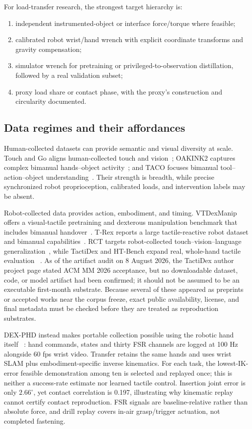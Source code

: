 For load-transfer research, the strongest target hierarchy is:

\begin{enumerate}
  \item independent instrumented-object or interface force/torque where feasible;
  \item calibrated robot wrist/hand wrench with explicit coordinate transforms and
  gravity compensation;
  \item simulator wrench for pretraining or privileged-to-observation
  distillation, followed by a real validation subset;
  \item proxy load share or contact phase, with the proxy's construction and
  circularity documented.
\end{enumerate}

\subsection{Data regimes and their affordances}

Human-collected datasets can provide semantic and visual diversity at scale.
Touch and Go aligns human-collected touch and vision~\cite{yang2022touchandgo}; OAKINK2
captures complex bimanual hands--object activity~\cite{zhan2024oakink2}; and TACO
focuses bimanual tool--action--object understanding~\cite{liu2024taco}. Their
strength is breadth, while precise synchronized robot proprioception, calibrated
loads, and intervention labels may be absent.

Robot-collected data provides action, embodiment, and timing. VTDexManip offers a
visual-tactile pretraining and dexterous manipulation benchmark that includes
bimanual handover~\cite{liu2025vtdexmanip}. T-Rex reports a large tactile-reactive
robot dataset and bimanual capabilities~\cite{niu2026trex}. RCT targets
robot-collected touch--vision--language generalization~\cite{he2026rct}, while
TactiDex and HT-Bench expand real, whole-hand tactile evaluation
~\cite{ni2026tactidex,huang2026htbench}. As of the artifact audit on 8 August
2026, the TactiDex author project page stated ACM MM 2026 acceptance, but no
downloadable dataset, code, or model artifact had been confirmed; it should not
be assumed to be an executable first-month substrate. Because several of these appeared as
preprints or accepted works near the corpus freeze, exact public availability,
license, and final metadata must be checked before they are treated as
reproduction substrates.

DEX-PHD instead makes portable collection possible using the robotic hand itself
~\cite{update2026dexphd}: hand commands, states and thirty FSR channels are logged
at 100 Hz alongside 60 fps wrist video. Transfer retains the same hands and uses
wrist SLAM plus embodiment-specific inverse kinematics. For each task, the
lowest-IK-error feasible demonstration among ten is selected and replayed once;
this is neither a success-rate estimate nor learned tactile control. Insertion
joint error is only $2.66^\circ$, yet contact correlation is 0.197, illustrating
why kinematic replay cannot certify contact reproduction. FSR signals are
baseline-relative rather than absolute force, and drill replay covers in-air
grasp/trigger actuation, not completed fastening.

